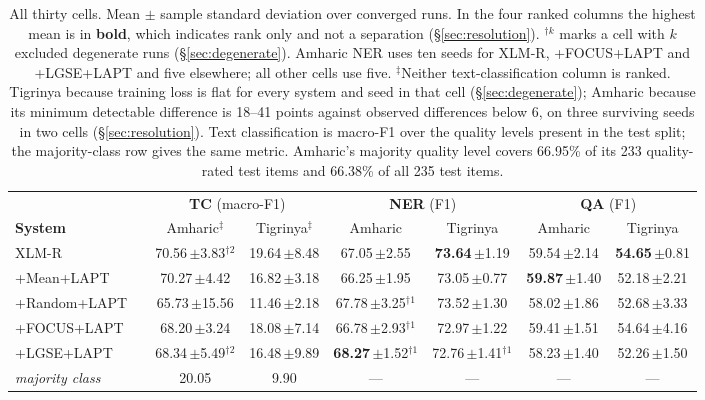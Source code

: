 \documentclass[11pt]{article}
\begin{document}
\begin{table}[t]
\centering
\small
\begin{tabular}{llcccccc}
\toprule
& & \multicolumn{2}{c}{\textbf{TC} (macro-F1)} & \multicolumn{2}{c}{\textbf{NER} (F1)} & \multicolumn{2}{c}{\textbf{QA} (F1)} \\
\cmidrule(lr){3-4}\cmidrule(lr){5-6}\cmidrule(lr){7-8}
\textbf{System} & & Amharic$^\ddagger$ & Tigrinya$^\ddagger$ & Amharic & Tigrinya & Amharic & Tigrinya \\
\midrule
XLM-R          & & 70.56\,\small{$\pm$3.83}$^{\dagger2}$ & 19.64\,\small{$\pm$8.48} & 67.05\,\small{$\pm$2.55} & \textbf{73.64}\,\small{$\pm$1.19} & 59.54\,\small{$\pm$2.14} & \textbf{54.65}\,\small{$\pm$0.81} \\
+Mean+LAPT     & & 70.27\,\small{$\pm$4.42} & 16.82\,\small{$\pm$3.18} & 66.25\,\small{$\pm$1.95} & 73.05\,\small{$\pm$0.77} & \textbf{59.87}\,\small{$\pm$1.40} & 52.18\,\small{$\pm$2.21} \\
+Random+LAPT   & & 65.73\,\small{$\pm$15.56} & 11.46\,\small{$\pm$2.18} & 67.78\,\small{$\pm$3.25}$^{\dagger1}$ & 73.52\,\small{$\pm$1.30} & 58.02\,\small{$\pm$1.86} & 52.68\,\small{$\pm$3.33} \\
+FOCUS+LAPT    & & 68.20\,\small{$\pm$3.24} & 18.08\,\small{$\pm$7.14} & 66.78\,\small{$\pm$2.93}$^{\dagger1}$ & 72.97\,\small{$\pm$1.22} & 59.41\,\small{$\pm$1.51} & 54.64\,\small{$\pm$4.16} \\
+LGSE+LAPT     & & 68.34\,\small{$\pm$5.49}$^{\dagger2}$ & 16.48\,\small{$\pm$9.89} & \textbf{68.27}\,\small{$\pm$1.52}$^{\dagger1}$ & 72.76\,\small{$\pm$1.41}$^{\dagger1}$ & 58.23\,\small{$\pm$1.40} & 52.26\,\small{$\pm$1.50} \\
\midrule
\multicolumn{2}{l}{\textit{majority class}} & 20.05 & 9.90 & --- & --- & --- & --- \\
\bottomrule
\end{tabular}
\caption{All thirty cells. Mean $\pm$ sample standard deviation over
converged runs. In the four ranked columns the highest mean is in
\textbf{bold}, which indicates rank only and not a separation
(\S\ref{sec:resolution}).
$^{\dagger k}$ marks a cell with $k$ excluded degenerate runs
(\S\ref{sec:degenerate}). Amharic NER uses ten seeds for XLM-R,
+FOCUS+LAPT and +LGSE+LAPT and five elsewhere; all other cells use five.
$^\ddagger$Neither text-classification column is ranked. Tigrinya because
training loss is flat for every system and seed in that cell
(\S\ref{sec:degenerate}); Amharic because its minimum detectable difference
is 18--41 points against observed differences below 6, on three surviving
seeds in two cells (\S\ref{sec:resolution}).
Text classification is macro-F1 over the quality levels present in the test
split; the majority-class row gives the same metric. Amharic's majority
quality level covers 66.95\% of its 233 quality-rated test items and 66.38\%
of all 235 test items.}
\label{tab:main}
\end{table}
\end{document}
